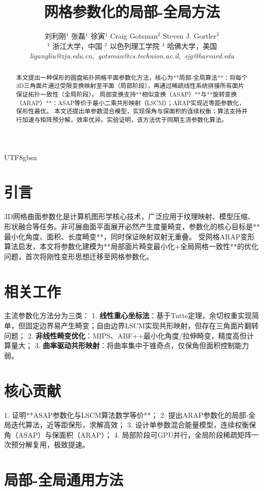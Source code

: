 \documentclass[10pt,a4paper,twocolumn]{article}
\title{网格参数化的局部-全局方法}
\author{
刘利刚$^1$ \quad 张磊$^1$ \quad 徐寅$^1$ \quad Craig Gotsman$^2$ \quad Steven J. Gortler$^3$ \\
$^1$ 浙江大学，中国 \quad $^2$ 以色列理工学院 \quad $^3$ 哈佛大学，美国 \\
\textit{ligangliu@zju.edu.cn,\ gotsman@cs.technion.ac.il,\ sjg@harvard.edu}
}
\date{}
\begin{document}
\begin{CJK*}{UTF8}{gbsn}
\maketitle

\begin{abstract}
本文提出一种保形的圆盘拓扑网格平面参数化方法，核心为**局部-全局算法**：将每个3D三角面片通过受限变换映射至平面（局部阶段），再通过稀疏线性系统拼接所有面片保证拓扑一致性（全局阶段）。
局部变换支持**相似变换（ASAP）**与**旋转变换（ARAP）**：ASAP等价于最小二乘共形映射（LSCM）；ARAP实现近等距参数化，保形性最优。
本文还提出单参数混合模型，实现保角与保面积的连续权衡；算法支持并行加速与矩阵预分解，效率优异。实验证明，该方法优于同期主流参数化算法。
\end{abstract}

\section{引言}
3D网格曲面参数化是计算机图形学核心技术，广泛应用于纹理映射、模型压缩、形状融合等任务。非可展曲面平面展开必然产生度量畸变，参数化的核心目标是**最小化角度、面积、长度畸变**，同时保证映射双射无重叠。
受网格ARAP变形算法启发，本文将参数化建模为**局部面片畸变最小化+全局网格一致性**的优化问题，首次将刚性变形思想迁移至网格参数化。

\section{相关工作}
主流参数化方法分为三类：
1. \textbf{线性重心坐标法}：基于Tutte定理，余切权重实现简单，但固定边界易产生畸变；自由边界LSCM实现共形映射，但存在三角面片翻转问题；
2. \textbf{非线性畸变优化}：MIPS、ABF++最小化角度/拉伸畸变，精度高但计算量大；
3. \textbf{曲率驱动共形映射}：将曲率集中于锥奇点，仅保角但面积控制能力弱。

\section{核心贡献}
1. 证明**ASAP参数化与LSCM算法数学等价**；
2. 提出ARAP参数化的局部-全局迭代算法，近等距保形，求解高效；
3. 设计单参数混合能量模型，连续权衡保角（ASAP）与保面积（ARAP）；
4. 局部阶段可GPU并行，全局阶段稀疏矩阵一次预分解复用，极致提速。

\section{局部-全局通用方法}

\end{CJK*}
\end{document}
